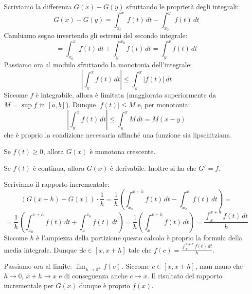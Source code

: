 \documentclass[12pt]{report}
\begin{document}
	\begin{dimostrazione}{}{}
		
		Scriviamo la differenza $G(x) - G(y)$ sfruttando le proprietà degli integrali:
		\[
		G(x) - G(y) = \int_{x_0}^{x} f(t) \, dt - \int_{x_0}^{y} f(t) \, dt
		\]
		Cambiamo segno invertendo gli estremi del secondo integrale:
		\[
		= \int_{x_0}^{x} f(t) \, dt + \int_{y}^{x_0} f(t) \, dt = \int_{y}^{x} f(t) \, dt
		\]
		Passiamo ora al modulo sfruttando la monotonia dell'integrale:
		\[
		\left| \int_{y}^{x} f(t) \, dt \right| \leq \int_{y}^{x} |f(t)| \, dt
		\]
		Siccome $f$ è integrabile, allora è limitata (maggiorata superiormente da $M = \sup f$ in $[a, b]$). Dunque $|f(t)| \leq M$ e, per monotonia:
		\[
		\left| \int_{y}^{x} f(t) \, dt \right| \leq \int_{y}^{x} M \, dt = M(x - y)
		\]
		che è proprio la condizione necessaria affinché una funzione sia lipschitziana.
		
	\end{dimostrazione}
	
	\begin{proposizione}{}{}
		
		Se $f(t) \geq 0$, allora $G(x)$ è monotona crescente.
		
	\end{proposizione}
	
	\begin{proposizione}{}{}
		
		Se $f(t)$ è continua, allora $G(x)$ è derivabile. Inoltre si ha che $G' = f$.
		
	\end{proposizione}
	
	\begin{dimostrazione}{}{}
		
		Scriviamo il rapporto incrementale:
		\[
		(G(x+h) - G(x)) \cdot \frac{1}{h} = \frac{1}{h} \left( \int_{x_0}^{x+h} f(t) \, dt - \int_{x_0}^{x} f(t) \, dt \right) =
		\]
		\[
		= \frac{1}{h} \left( \int_{x_0}^{x+h} f(t) \, dt + \int_{x}^{x_0} f(t) \, dt \right) = \frac{1}{h} \left( \int_{x}^{x+h} f(t) \, dt \right) = \frac{\int_{x}^{x+h} f(t) \, dt}{h}
		\]
		Siccome $h$ è l'ampiezza della partizione questo calcolo è proprio la formula della media integrale.
		Dunque $\exists c \in [x, x+h]$ tale che $f(c) = \frac{\int_{x}^{x+h} f(t) \, dt}{h}$.
		
		Passiamo ora al limite: $\lim_{h \to 0^+} f(c)$.
		Siccome $c \in [x, x+h]$, man mano che $h \to 0$, $x+h \to x$ e di conseguenza anche $c \to x$.
		Il risultato del rapporto incrementale per $G(x)$ dunque è proprio $f(x)$.
		
	\end{dimostrazione}
	
\end{document}
